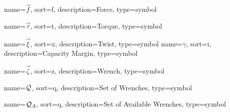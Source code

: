 	{%
		name=\ensuremath{\vec{f}},
		sort=f,
		description=Force,
		type=symbol
	}
	\newcommand{\force}{\gls{sym:force}}

	{%
		name=\ensuremath{\vec{\tau}},
		sort=t,
		description=Torque,
		type=symbol
	}
	\newcommand{\torque}{\gls{sym:torque}}

	{%
		name=\ensuremath{\vec{\xi}},
		sort=x,
		description=Twist,
		type=symbol
	}
	\newcommand{\twist}{\gls{sym:twist}}
	{%
		name=\ensuremath{\gamma},
		sort=i,
		description=Capacity Margin,
		type=symbol
	}
	\newcommand{\capacitymargin}{\gls{sym:capacitymargin}}

	{%
		name=\ensuremath{\vec{\zeta}},
		sort=z,
		description=Wrench,
		type=symbol
	}
	\newcommand{\wrench}{\gls{sym:wrench}}

	{%
		name=\ensuremath{\set{Q}},
		sort=q,
		description=Set of Wrenches,
		type=symbol
	}
	\newcommand{\setofwrenches}{\gls{sym:setofwrenches}}

	{%
		name=\ensuremath{{\set{Q}_A}},
		sort=q,
		description=Set of Available Wrenches,
		type=symbol
	}
	\newcommand{\setofavwrenches}{\gls{sym:setofavwrenches}}

